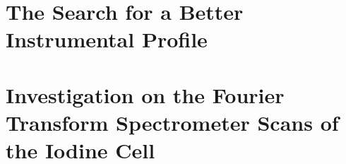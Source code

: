 \section{The Search for a Better Instrumental Profile}\label{het:sec:ip}




\section{Investigation on the Fourier Transform Spectrometer Scans of the Iodine Cell}\label{het:sec:fts}




  
